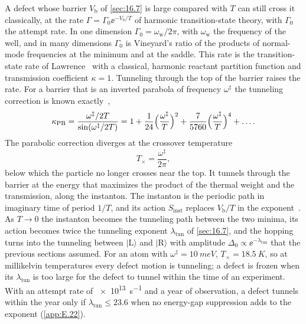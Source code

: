 A defect whose barrier $V_{\mathrm{b}}$ of \cref{sec:16.7} is large compared with $T$ can still cross it classically, at the rate $\varGamma = \varGamma_0\ee^{-V_{\mathrm{b}}/T}$ of harmonic transition-state theory, with $\varGamma_0$ the attempt rate. In one dimension $\varGamma_0 = \omega_{\mathrm{w}}/2\pi$, with $\omega_{\mathrm{w}}$ the frequency of the well, and in many dimensions $\varGamma_0$ is Vineyard's ratio of the products of normal-mode frequencies at the minimum and at the saddle. This rate is the transition-state rate of Lawrence~\cite[Eq.~(1)]{lawrence2024semiclassical} with a classical, harmonic reactant partition function and transmission coefficient $\kappa = 1$. Tunneling through the top of the barrier raises the rate. For a barrier that is an inverted parabola of frequency $\omega^\ddagger$ the tunneling correction is known exactly~\cite[Eq.~(3)]{lawrence2024semiclassical},
\begin{equation}
  \kappa_{\mathrm{PB}} = \frac{\omega^\ddagger/2T}{\sin(\omega^\ddagger/2T)} = 1 + \frac{1}{24}\Bigl(\frac{\omega^\ddagger}{T}\Bigr)^2 + \frac{7}{5760}\Bigl(\frac{\omega^\ddagger}{T}\Bigr)^4 + \dots .
  \label{eq:16.8-kappa}
\end{equation}
The parabolic correction diverges at the crossover temperature
\begin{equation}
  T_\times = \frac{\omega^\ddagger}{2\pi} ,
  \label{eq:16.8-Tx}
\end{equation}
below which the particle no longer crosses near the top. It tunnels through the barrier at the energy that maximizes the product of the thermal weight and the transmission, along the instanton. The instanton is the periodic path in imaginary time of period $1/T$, and its action $S_{\mathrm{inst}}$ replaces $V_{\mathrm{b}}/T$ in the exponent~\cite[Eq.~(4)]{lawrence2024semiclassical}. As $T \to 0$ the instanton becomes the tunneling path between the two minima, its action becomes twice the tunneling exponent $\lambda_{\mathrm{tun}}$ of \cref{sec:16.7}, and the hopping turns into the tunneling between $|\mathrm{L}\rangle$ and $|\mathrm{R}\rangle$ with amplitude $\Delta_0 \propto \ee^{-\lambda_{\mathrm{tun}}}$ that the previous sections assumed. For an atom with $\omega^\ddagger = \SI{10}{meV}$, $T_\times = \SI{18.5}{K}$, so at millikelvin temperatures every defect motion is tunneling; a defect is frozen when its $\lambda_{\mathrm{tun}}$ is too large for the defect to tunnel within the time of an experiment. With an attempt rate of \SI{e13}{s^{-1}} and a year of observation, a defect tunnels within the year only if $\lambda_{\mathrm{tun}} \le 23.6$ when no energy-gap suppression adds to the exponent (\cref{app:E.22}).

